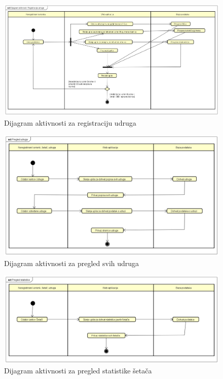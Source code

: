 		\begin{figure}[H]
			\includegraphics[scale=0.3]{dijagrami/Dijagram_aktivnosti-Registracija_udruge.png}
			\centering
			\caption{Dijagram aktivnosti za registraciju udruga}
			\label{fig:activity_diagram_2}
		\end{figure}	

		\begin{figure}[H]
			\includegraphics[scale=0.4]{dijagrami/Pregled_udruga.png}
			\centering
			\caption{Dijagram aktivnosti za pregled svih udruga}
			\label{fig:activity_diagram_3}
		\end{figure}

		\begin{figure}[H]
			\includegraphics[scale=0.4]{dijagrami/Pregled_statistike.png}
			\centering
			\caption{Dijagram aktivnosti za pregled statistike šetača}
			\label{fig:activity_diagram_4}
		\end{figure}


